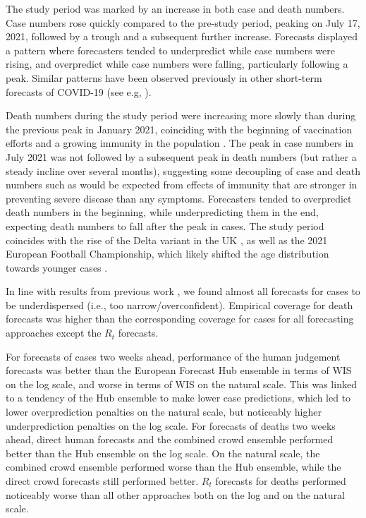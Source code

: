 \documentclass[10pt,a4paper,twocolumn]{article}
\begin{document}
The study period was marked by an increase in both case and death numbers. Case numbers rose quickly compared to the pre-study period, peaking on July 17, 2021, followed by a trough and a subsequent further increase. Forecasts displayed a pattern where forecasters tended to underpredict while case numbers were rising, and overpredict while case numbers were falling, particularly following a peak. Similar patterns have been observed previously in other short-term forecasts of COVID-19 (see e.g, \citep{sherrattPredictivePerformanceMultimodel2022, bracherPreregisteredShorttermForecasting2021a, bosseComparingHumanModelbased2022}).

Death numbers during the study period were increasing more slowly than during the previous peak in January 2021, coinciding with the beginning of vaccination efforts and a growing immunity in the population \citep{perez-guzmanEpidemiologicalDriversTransmissibility2023}. The peak in case numbers in July 2021 was not followed by a subsequent peak in death numbers (but rather a steady incline over several months), suggesting some decoupling of case and death numbers such as would be expected from effects of immunity that are stronger in preventing severe disease than any symptoms. Forecasters tended to overpredict death numbers in the beginning, while underpredicting them in the end, expecting death numbers to fall after the peak in cases. The study period coincides with the rise of the Delta variant in the UK \citep{bastIncreasedRiskHospitalisation2021, perez-guzmanEpidemiologicalDriversTransmissibility2023}, as well as the 2021 European Football Championship, which likely shifted the age distribution towards younger cases \citep{dehningImpactEuro20202023}.

In line with results from previous work \citep{bosseComparingHumanModelbased2022, sherrattPredictivePerformanceMultimodel2022}, we found almost all forecasts for cases to be underdispersed (i.e., too narrow/overconfident). Empirical coverage for death forecasts was higher than the corresponding coverage for cases for all forecasting approaches except the $R_t$ forecasts. 

For forecasts of cases two weeks ahead, performance of the human judgement forecasts was better than the European Forecast Hub ensemble in terms of WIS on the log scale, and worse in terms of WIS on the natural scale. This was linked to a tendency of the Hub ensemble to make lower case predictions, which led to lower overprediction penalties on the natural scale, but noticeably higher underprediction penalties on the log scale. 
For forecasts of deaths two weeks ahead, direct human forecasts and the combined crowd ensemble performed better than the Hub ensemble on the log scale. On the natural scale, the combined crowd ensemble performed worse than the Hub ensemble, while the direct crowd forecasts still performed better. $R_t$ forecasts for deaths performed noticeably worse than all other approaches both on the log and on the natural scale. 
\end{document}
